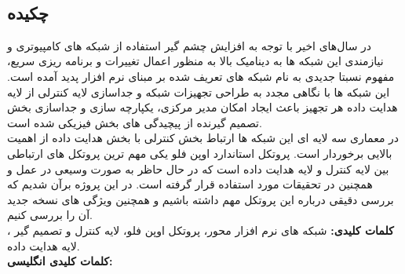 
\setcounter{page}{1}
\thispagestyle{empty}

~\vfill

\subsection*{چکیده}
\begin{small}
\baselineskip=0.7cm

در سال‌های اخیر با توجه به افزایش چشم گیر استفاده از شبکه های کامپیوتری و نیازمندی این شبکه ها به دینامیک بالا به منظور اعمال تغییرات و برنامه ریزی سریع، مفهوم نسبتا جدیدی به نام شبکه های تعریف شده بر مبنای نرم افزار  پدید آمده است. این شبکه ها با نگاهی مجدد به طراحی تجهیزات شبکه و جداسازی لایه کنترلی  از لایه هدایت داده  هر تجهیز باعث ایجاد امکان مدیر مرکزی، یکپارچه سازی و جداسازی بخش تصمیم گیرنده از پیچیدگی های بخش فیزیکی شده است.\\
در معماری سه لایه ای این شبکه ها ارتباط بخش کنترلی با بخش هدایت داده از اهمیت بالایی برخوردار است. پروتکل استاندارد اوپن فلو  یکی مهم ترین پروتکل های ارتباطی بین لایه کنترل و لایه هدایت داده است که در حال حاظر به صورت وسیعی در عمل و همچنین در تحقیقات مورد استفاده قرار گرفته است. در این پروژه برآن شدیم که بررسی دقیقی درباره این پروتکل مهم داشته باشیم و همچنین ویژگی های نسخه جدید آن را بررسی کنیم.\\

\noindent\textbf{کلمات کلیدی:} شبکه های نرم افزار محور، پروتکل اوپن فلو، لایه کنترل و تصمیم گیر ، لایه هدایت داده. \\
\noindent\textbf{کلمات کلیدی انگلیسی:} 
\\

\end{small}